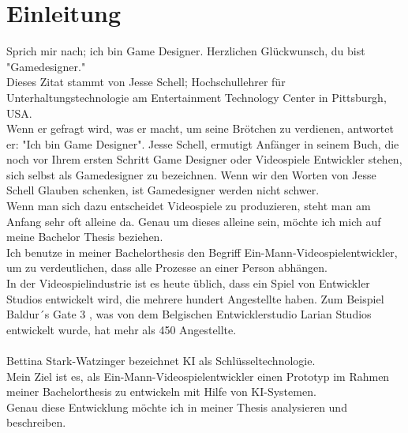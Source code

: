 \documentclass[10pt,a4paper,bibliography=totocnumbered,listof=totocnumbered]{scrartcl}
\begin{document}
\section{Einleitung}
Sprich mir nach; ich bin Game Designer. Herzlichen Glückwunsch, du bist "Gamedesigner."
\\
Dieses Zitat stammt von Jesse Schell; Hochschullehrer für Unterhaltungstechnologie am Entertainment Technology Center in Pittsburgh, USA.
\\
Wenn er gefragt wird, was er macht, um seine Brötchen zu verdienen, antwortet er: "Ich bin Game Designer". Jesse Schell, ermutigt Anfänger in seinem Buch, die noch vor Ihrem ersten Schritt Game Designer oder Videospiele Entwickler stehen, sich selbst als Gamedesigner zu bezeichnen. Wenn wir den Worten von Jesse Schell Glauben schenken, ist Gamedesigner werden nicht schwer.
\\
Wenn man sich dazu entscheidet Videospiele zu produzieren, steht man am Anfang sehr oft alleine da. Genau um dieses alleine sein, möchte ich mich auf meine Bachelor Thesis beziehen.
\\
Ich benutze in meiner Bachelorthesis den Begriff Ein-Mann-Videospielentwickler, um zu verdeutlichen, dass alle Prozesse an einer Person abhängen.
\\
In der Videospielindustrie ist es heute üblich, dass ein Spiel von Entwickler Studios entwickelt wird, die mehrere hundert Angestellte haben. Zum Beispiel Baldur´s Gate 3 , was von dem Belgischen Entwicklerstudio Larian Studios entwickelt wurde, hat mehr als 450 Angestellte.
\\
\\
Bettina Stark-Watzinger bezeichnet KI als Schlüsseltechnologie.
\\
Mein Ziel ist es, als Ein-Mann-Videospielentwickler einen Prototyp im Rahmen meiner Bachelorthesis zu entwickeln mit Hilfe von KI-Systemen.
\\
Genau diese Entwicklung möchte ich in meiner Thesis analysieren und beschreiben.
 
\end{document}
